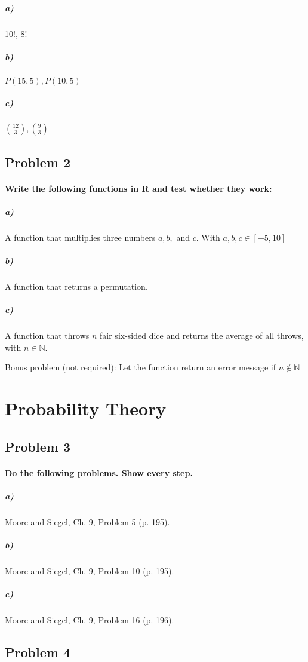 \documentclass[12pt,letter]{article}
\begin{document}
\subparagraph{a)} 10!, 8!

\subparagraph{b)} $P(15,5), P(10,5)$

\subparagraph{c)} $\binom{12}{3}, \binom{9}{3}$



\subsection*{Problem 2}

\paragraph{Write the following functions in R and test whether they work:}

\subparagraph{a)} A function that multiplies three numbers $a, b,$ and $c$. With $a, b, c \in [-5,10]$

\subparagraph{b)} A function that returns a permutation.

\subparagraph{c)} A function that throws $n$ fair six-sided dice and returns the average of all throws, with $n \in \mathbb{N}$.

Bonus problem (not required): Let the function return an error message if $n \notin \mathbb{N}$ 



\section*{Probability Theory}

\subsection*{Problem 3}

\paragraph{Do the following problems. Show every step.}

\subparagraph{a)} Moore and Siegel, Ch. 9, Problem 5 (p. 195).

\subparagraph{b)} Moore and Siegel, Ch. 9, Problem 10 (p. 195).

\subparagraph{c)} Moore and Siegel, Ch. 9, Problem 16 (p. 196).



\subsection*{Problem 4}
\end{document}
